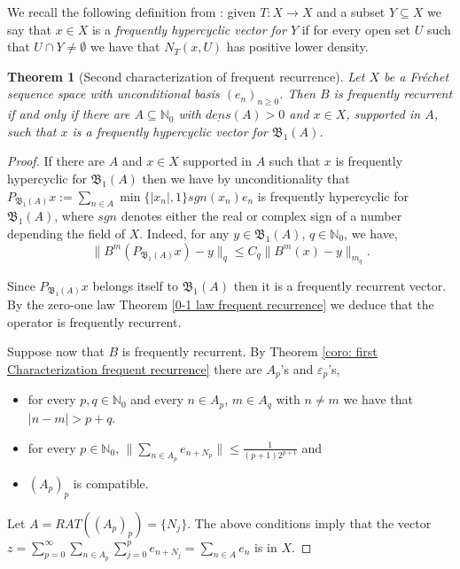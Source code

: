 \documentclass[11pt]{amsart}
\newtheorem{theorem}{Theorem}[section]
\newcommand{\zN}{\mathbb N}
\begin{document}
We recall the following definition from \cite {Gro19bilateral}:  given $T:X\to X$ and a subset $Y\subseteq X$ we say that $x\in X$ is a \emph{frequently hypercyclic vector for $Y$} if for every open set $U$ such that $U\cap Y\neq \emptyset$ we have that $N_T(x,U)$ has positive lower density.

\begin{theorem}[Second characterization of frequent recurrence] \label{thm: caract S_1(A)}
Let $X$ be a Fr\'echet sequence space with unconditional basis $(e_n)_{n\ge 0}$. Then $B$ is frequently recurrent if and only if there are $A\subseteq \mathbb N_0$ with $\underline {dens}(A)>0$ and $x\in X$, supported in $A$, such that $x$ is a frequently hypercyclic vector for $\mathfrak B_1(A)$. 
\end{theorem}

\begin{proof}
If there are $A$ and $x\in X$ supported in $A$ such that $x$ is frequently hypercyclic for $\mathfrak B_1(A)$ then we have by unconditionality that $P_{\mathfrak B_1(A)} x:= \sum_{n\in A} \min\{|x_n|,1\}sgn(x_n) e_n$ is frequently hypercyclic for $\mathfrak B_1(A)$, where $sgn$ denotes either the real or complex sign of a number depending the field of $X$. Indeed, for any $y\in \mathfrak B_1(A)$, $q\in \mathbb N_0$, we have,
$$
\|B^m(P_{\mathfrak B_1(A)} x)-y\|_q\le C_q \|B^m( x)-y\|_{m_q}.
$$


Since $P_{\mathfrak B_1(A)} x$ belongs itself to $\mathfrak B_1(A)$ then it is a frequently recurrent vector. By the zero-one law Theorem \ref{0-1 law frequent recurrence} we deduce that the operator is frequently recurrent.  

Suppose now that $B$ is frequently recurrent. 
By Theorem \ref{coro: first Characterization frequent recurrence} there are $A_p$'s and $\varepsilon_p$'s, 
\begin{itemize}
    \item for every $p,q\in\mathbb N_0$ and every $n\in A_p$, $m\in A_q$ with $n\neq m$ we have that $|n-m|>p+q.$
    \item for every $p\in \zN_0$, $\|\sum_{n\in A_p} e_{n+N_p}\|\leq\frac{1}{(p+1)2^{p+1}}$ and
    \item $(A_p)_p$ is compatible.
\end{itemize}

Let $A=RAT((A_p)_p)=\{N_j\}$.
The above conditions  imply that the vector $z=\sum_{p=0}^\infty\sum_{n\in A_p} \sum_{j=0}^{p} e_{n+N_j}=\sum_{n\in A} e_n$ is in $X$. 


\end{proof}
\end{document}
